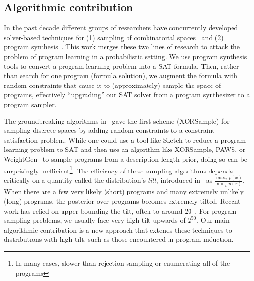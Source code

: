 \documentclass{article}
\begin{document}
\subsection{Algorithmic contribution}
In the past decade different groups of researchers have  concurrently developed solver-based %
 techniques for (1) sampling of combinatorial spaces~\cite{gomes2006near,ermon2013embed,AAAI148364,chakraborty2013scalable} and (2) program synthesis~\cite{solar2008program,jha2010oracle}.
This work merges these two lines of research to attack the problem of program learning in a probabilistic setting.
We use program synthesis tools to convert a program learning problem into a SAT formula.
Then,
rather than search for one program (formula solution),
we augment the formula with random constraints that cause it to (approximately) sample the space of programs,
effectively ``upgrading'' our SAT solver from a program synthesizer to a program sampler.

The groundbreaking algorithms in~\cite{gomes2006near}
gave the first scheme (XORSample) for sampling discrete spaces by adding random constraints to a constraint satisfaction problem.
While one could use a tool like Sketch to reduce a program learning problem to SAT
and then use an algorithm like XORSample, PAWS, or WeightGen~\cite{gomes2006near,ermon2013embed,AAAI148364}
to sample programs from a description length prior,
doing so can be surprisingly inefficient\footnote{In many cases, slower than rejection sampling or enumerating all of the programs}.
The efficiency of these sampling algorithms depends critically on
a quantity called the distribution's \emph{tilt},
introduced in~\cite{AAAI148364} as $\frac{\max_x p(x)}{\min_x p(x)}$.
When there are a few very likely (short) programs and many extremely unlikely (long) programs,
the posterior over programs becomes extremely tilted.
Recent work has relied on upper bounding the tilt,
often to around 20~\cite{AAAI148364}.
For program sampling problems, we usually face very high tilt upwards of $2^{50}$.
Our main algorithmic contribution is a new approach that extends these techniques to distributions with high tilt,
such as those encountered in program induction.
\end{document}
